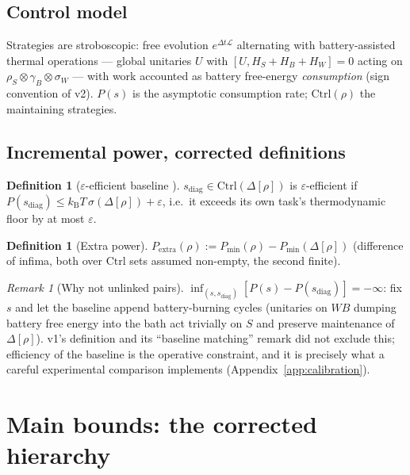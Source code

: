 \documentclass[11pt,a4paper]{article}
\theoremstyle{plain}
\theoremstyle{definition}
\newtheorem{definition}[theorem]{Definition}
\theoremstyle{remark}
\newtheorem{remark}[theorem]{Remark}
\newcommand{\kB}{k_{\mathrm{B}}}
\newcommand{\Ctrl}{\mathrm{Ctrl}}
\newcommand{\Pextra}{P_{\mathrm{extra}}}
\newcommand{\Pmin}{P_{\min}}
\begin{document}
\subsection{Control model}

Strategies are stroboscopic: free evolution $e^{\Delta t\mathcal{L}}$
alternating with battery-assisted thermal operations --- global unitaries $U$
with $[U, H_S + H_B + H_W] = 0$ acting on $\rho_S \otimes \gamma_B \otimes
\sigma_W$ --- with work accounted as battery free-energy \emph{consumption}
(sign convention of \cite{MaintWork} v2). $P(s)$ is the asymptotic
consumption rate; $\Ctrl(\rho)$ the maintaining strategies.

\subsection{Incremental power, corrected definitions}

\begin{definition}[$\varepsilon$-efficient baseline \cite{MaintWork}]
$s_{\mathrm{diag}} \in \Ctrl(\Delta[\rho])$ is $\varepsilon$-efficient if
$P(s_{\mathrm{diag}}) \le \kB T\,\sigma(\Delta[\rho]) + \varepsilon$, i.e.\
it exceeds its own task's thermodynamic floor by at most $\varepsilon$.
\end{definition}

\begin{definition}[Extra power]
$\Pextra(\rho) := \Pmin(\rho) - \Pmin(\Delta[\rho])$ (difference of infima,
both over $\Ctrl$ sets assumed non-empty, the second finite).
\end{definition}

\begin{remark}[Why not unlinked pairs]\label{rem:vacuous}
$\inf_{(s, s_{\mathrm{diag}})}[P(s) - P(s_{\mathrm{diag}})] = -\infty$: fix
$s$ and let the baseline append battery-burning cycles (unitaries on $WB$
dumping battery free energy into the bath act trivially on $S$ and preserve
maintenance of $\Delta[\rho]$). v1's definition and its ``baseline
matching'' remark did not exclude this; efficiency of the baseline is the
operative constraint, and it is precisely what a careful experimental
comparison implements (Appendix~\ref{app:calibration}).
\end{remark}

\section{Main bounds: the corrected hierarchy}
\end{document}
